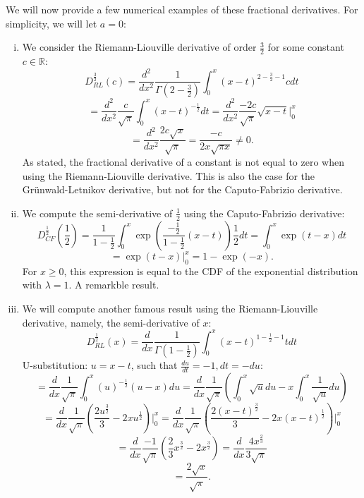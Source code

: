 We will now provide a few numerical examples of these fractional derivatives. For simplicity, we will let \(a = 0\):
\begin{example}
    \begin{enumerate}[(i)]
        \item 
    
    We consider the Riemann-Liouville derivative of order \(\frac{3}{2}\) for some constant \(c \in \mathbb{R}\):
    \[D^{\frac{3}{2}}_{RL}(c) = \frac{d^2}{dx^2} \frac{1}{\Gamma(2 - \frac{3}{2})}  \int_{0}^{x} (x-t)^{2 - \frac{3}{2}-1} c dt\]
    \[= \frac{d^2}{dx^2} \frac{c}{\sqrt{\pi}}  \int_{0}^{x} (x-t)^{- \frac{1}{2}} dt = \frac{d^2}{dx^2} \frac{-2c}{\sqrt{\pi}} \sqrt{x - t} \Big|_{0}^{x}\]
    \[= \frac{d^2}{dx^2} \frac{2c \sqrt{x}}{\sqrt{\pi}} = \frac{-c}{2x\sqrt{\pi x}} \neq 0.\] As stated, the fractional derivative of a constant is not equal to zero when using the Riemann-Liouville derivative. This is also the case for the Grünwald-Letnikov derivative, but not for the Caputo-Fabrizio derivative.
    \item We compute the semi-derivative of \(\frac{1}{2}\) using the Caputo-Fabrizio derivative:
    \[D^{\frac{1}{2}}_{CF}(\frac{1}{2}) = \frac{1}{1 - \frac{1}{2}}  \int_{0}^{x} \exp\left(\frac{-\frac{1}{2}}{1 - \frac{1}{2}}(x-t)\right) \frac{1}{2} dt = \int_{0}^{x} \exp(t - x) dt\]
    \[ =  \exp(t - x) \Big|_{0}^{x} = 1 - \exp(- x).\]
    For \(x \geq 0\), this expression is equal to the CDF of the exponential distribution with \(\lambda = 1\). A remarkble result.
    \item We will compute another famous result using the Riemann-Liouville derivative, namely, the semi-derivative of \(x\):
    \[D^{\frac{1}{2}}_{RL}(x) = \frac{d}{dx} \frac{1}{\Gamma(1 - \frac{1}{2})}  \int_{0}^{x} (x-t)^{1 - \frac{1}{2}-1} t dt\]
   U-substitution: \( u = x - t\), such that \(\frac{du}{dt} = -1, dt = -du\):
    \[=  \frac{d}{dx} \frac{1}{\sqrt{\pi}} \int_{0}^{x} (u)^{-\frac{1}{2}} (u - x) du =  \frac{d}{dx} \frac{1}{\sqrt{\pi}}\left(\int_{0}^{x} \sqrt{u} du - x\int_{0}^{x} \frac{1}{\sqrt{u}} du\right)\]
    \[ = \frac{d}{dx} \frac{1}{\sqrt{\pi}}\left(\frac{2u^\frac{3}{2}}{3} - 2 x u^\frac{1}{2}\right) \Big|_{0}^{x} = \frac{d}{dx} \frac{1}{\sqrt{\pi}}\left(\frac{2(x - t)^\frac{3}{2}}{3} - 2 x (x - t)^\frac{1}{2}\right) \Big|_{0}^{x}\]
    \[=  \frac{d}{dx} \frac{-1}{\sqrt{\pi}}\left(\frac{2}{3}x^\frac{3}{2} - 2x^\frac{3}{2}\right) = \frac{d}{dx} \frac{4x^\frac{2}{3}}{3\sqrt{\pi}}\]
    \[ = \frac{2\sqrt{x}}{\sqrt{\pi}}.\]
    \end{enumerate}
\end{example}
